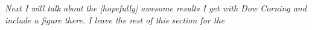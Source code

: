 \emph{Next I will talk about the [hopefully] awesome results I get with Dow Corning and include a figure there. I leave the rest of this section for the }




